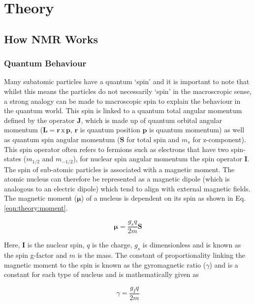 \chapter{Theory}
\label{Chap:Theory}

\section{How \texorpdfstring{\ac{NMR}}{NMR} Works}
\subsection{Quantum Behaviour}

Many subatomic particles have a quantum `spin' and it is important to note that whilst this means the particles do not necessarily `spin' in the macroscropic sense, a strong analogy can be made to macroscopic spin to explain the behaviour in the quantum world. This spin is linked to a quantum total angular momentum defined by the operator $\mathbf{J}$, which is made up of quantum orbital angular momentum ($\mathbf{L} = \mathbf{r}\, \textrm{x} \, \mathbf{p}$, $\mathbf{r}$ is quantum position $\mathbf{p}$ is quantum momentum) as well as quantum spin angular momentum ($\mathbf{S}$ for total spin and $m_s$ for z-component). This spin operator often refers to fermions such as electrons that have two spin-states ($m_{1/2}$ and $m_{-1/2}$), for nuclear spin angular momentum the spin operator $\mathbf{I}$. The spin of sub-atomic particles is associated with a magnetic moment. The atomic nucleus can therefore be represented as a magnetic dipole (which is analogous to an electric dipole) which tend to align with external magnetic fields. The magnetic moment ($\boldsymbol\mu$) of a nucleus is dependent on its spin as shown in Eq. \ref{eqn:theory:moment}.

\begin{equation}
    \boldsymbol\mu = \frac{g_sq}{2m} \mathbf{S}
    \label{eqn:theory:moment}
\end{equation}

Here, $\mathbf{I}$ is the nuclear spin, $q$ is the charge, $g_s$ is dimensionless and is known as the spin g-factor and $m$ is the mass. The constant of proportionality linking the magnetic moment to the spin is known as the gyromagnetic ratio ($\gamma$) and is a constant for each type of nucleus and is mathematically given as

\begin{equation}
    \gamma = \frac{g_Iq}{2m}
    \label{eqn:theory:gyro}
\end{equation}

